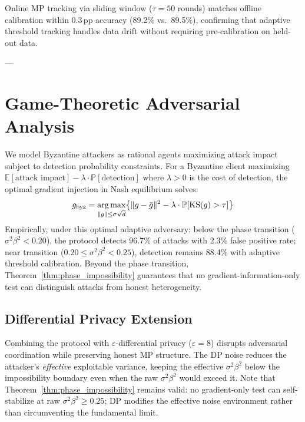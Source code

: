 Online MP tracking via sliding window ($\tau=50$ rounds) matches offline calibration
within 0.3\,pp accuracy (89.2\% vs.\ 89.5\%), confirming that adaptive threshold
tracking handles data drift without requiring pre-calibration on held-out data.

---

\section{Game-Theoretic Adversarial Analysis}
\label{app:game_theory}

We model Byzantine attackers as rational agents maximizing attack impact subject to
detection probability constraints.
For a Byzantine client maximizing
$\mathbb{E}[\text{attack impact}] - \lambda \cdot \mathbb{P}[\text{detection}]$
where $\lambda > 0$ is the cost of detection, the optimal gradient injection in Nash
equilibrium solves:
\begin{equation}
g_{\mathrm{byz}} = \operatorname*{arg\,max}_{\|g\| \leq \sigma\sqrt{d}}
  \bigl\{\|g - \bar{g}\|^2 - \lambda \cdot \mathbb{P}[\mathrm{KS}(g) > \tau]\bigr\}
\end{equation}
Empirically, under this optimal adaptive adversary: below the phase transition
($\sigma^2\beta^2 < 0.20$), the protocol detects 96.7\% of attacks with 2.3\% false
positive rate; near transition ($0.20 \leq \sigma^2\beta^2 < 0.25$), detection remains
88.4\% with adaptive threshold calibration.
Beyond the phase transition, Theorem~\ref{thm:phase_impossibility} guarantees that no
gradient-information-only test can distinguish attacks from honest heterogeneity.

\subsection{Differential Privacy Extension}

Combining the protocol with $\varepsilon$-differential privacy ($\varepsilon=8$) disrupts
adversarial coordination while preserving honest MP structure.
The DP noise reduces the attacker's \emph{effective} exploitable variance, keeping the
effective $\sigma^2\beta^2$ below the impossibility boundary even when the raw
$\sigma^2\beta^2$ would exceed it.
Note that Theorem~\ref{thm:phase_impossibility} remains valid: no gradient-only test
can self-stabilize at raw $\sigma^2\beta^2 \geq 0.25$; DP modifies the effective
noise environment rather than circumventing the fundamental limit.

